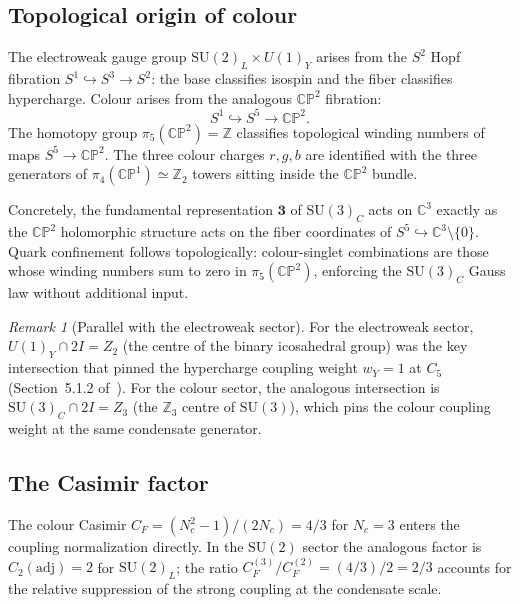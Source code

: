 \documentclass[11pt,a4paper]{article}
\theoremstyle{definition}
\theoremstyle{remark}
\newtheorem{remark}[theorem]{Remark}
\begin{document}
\subsection{Topological origin of colour}

The electroweak gauge group $\mathrm{SU}(2)_L\times U(1)_Y$ arises
from the $S^2$ Hopf fibration $S^1\hookrightarrow S^3\to S^2$:
the base classifies isospin and the fiber classifies hypercharge.
Colour arises from the analogous $\mathbb{CP}^2$ fibration:
\begin{equation}
  S^1 \hookrightarrow S^5 \to \mathbb{CP}^2.
\end{equation}
The homotopy group $\pi_5(\mathbb{CP}^2) = \mathbb{Z}$ classifies
topological winding numbers of maps $S^5\to\mathbb{CP}^2$.
The three colour charges $r,g,b$ are identified with the three
generators of $\pi_4(\mathbb{CP}^1)\simeq\mathbb{Z}_2$ towers sitting
inside the $\mathbb{CP}^2$ bundle.

Concretely, the fundamental representation $\mathbf{3}$ of
$\mathrm{SU}(3)_C$ acts on $\mathbb{C}^3$ exactly as the
$\mathbb{CP}^2$ holomorphic structure acts on the fiber coordinates
of $S^5\hookrightarrow\mathbb{C}^3\setminus\{0\}$.
Quark confinement follows topologically: colour-singlet combinations
are those whose winding numbers sum to zero in $\pi_5(\mathbb{CP}^2)$,
enforcing the $\mathrm{SU}(3)_C$ Gauss law without additional input.

\begin{remark}[Parallel with the electroweak sector]
\label{P5:rem:ew_colour_parallel}
For the electroweak sector, $U(1)_Y\cap 2I = Z_2$ (the centre of the
binary icosahedral group) was the key intersection that pinned the
hypercharge coupling weight $w_Y=1$ at $C_5$ (Section~5.1.2 of~\cite{Paper1}).
For the colour sector, the analogous intersection is
$\mathrm{SU}(3)_C\cap 2I = Z_3$ (the $\mathbb{Z}_3$ centre of
$\mathrm{SU}(3)$), which pins the colour coupling weight at the
same condensate generator.
\end{remark}

\subsection{The Casimir factor}

The colour Casimir $C_F = (N_c^2-1)/(2N_c) = 4/3$ for $N_c=3$ enters
the coupling normalization directly.  In the $\mathrm{SU}(2)$ sector
the analogous factor is $C_2(\mathrm{adj})=2$ for $\mathrm{SU}(2)_L$;
the ratio $C_F^{(3)}/C_F^{(2)} = (4/3)/2 = 2/3$ accounts for the
relative suppression of the strong coupling at the condensate scale.
\end{document}

